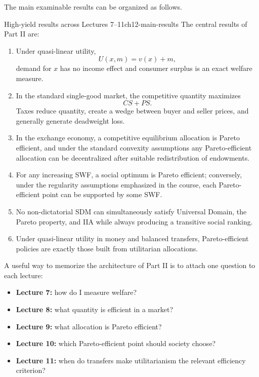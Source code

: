 The main examinable results can be organized as follows.

\begin{theorem}{High-yield results across Lectures 7--11}{ch12-main-results}
The central results of Part II are:
\begin{enumerate}
    \item Under quasi-linear utility,
    \[
    U(x,m)=v(x)+m,
    \]
    demand for \(x\) has no income effect and consumer surplus is an exact welfare measure.
    \item In the standard single-good market, the competitive quantity maximizes
    \[
    CS+PS.
    \]
    Taxes reduce quantity, create a wedge between buyer and seller prices, and generally generate deadweight loss.
    \item In the exchange economy, a competitive equilibrium allocation is Pareto efficient, and under the standard convexity assumptions any Pareto-efficient allocation can be decentralized after suitable redistribution of endowments.
    \item For any increasing SWF, a social optimum is Pareto efficient; conversely, under the regularity assumptions emphasized in the course, each Pareto-efficient point can be supported by some SWF.
    \item No non-dictatorial SDM can simultaneously satisfy Universal Domain, the Pareto property, and IIA while always producing a transitive social ranking.
    \item Under quasi-linear utility in money and balanced transfers, Pareto-efficient policies are exactly those built from utilitarian allocations.
\end{enumerate}
\end{theorem}

\begin{examtip}
A useful way to memorize the architecture of Part II is to attach one question to each lecture:
\begin{itemize}
    \item \textbf{Lecture 7:} how do I measure welfare?
    \item \textbf{Lecture 8:} what quantity is efficient in a market?
    \item \textbf{Lecture 9:} what allocation is Pareto efficient?
    \item \textbf{Lecture 10:} which Pareto-efficient point should society choose?
    \item \textbf{Lecture 11:} when do transfers make utilitarianism the relevant efficiency criterion?
\end{itemize}
\end{examtip}

